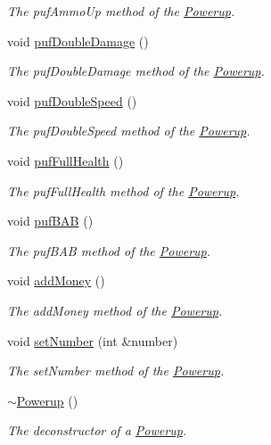 \begin{DoxyCompactItemize}
\begin{DoxyCompactList}\small\item\em The puf\+Ammo\+Up method of the \hyperlink{class_powerup}{Powerup}. \end{DoxyCompactList}\item 
void \hyperlink{class_powerup_a9e3e6d2edbd7ce8c873deedb22e1702f}{puf\+Double\+Damage} ()
\begin{DoxyCompactList}\small\item\em The puf\+Double\+Damage method of the \hyperlink{class_powerup}{Powerup}. \end{DoxyCompactList}\item 
void \hyperlink{class_powerup_ac009392b9c8baacde7677547fe599fb6}{puf\+Double\+Speed} ()
\begin{DoxyCompactList}\small\item\em The puf\+Double\+Speed method of the \hyperlink{class_powerup}{Powerup}. \end{DoxyCompactList}\item 
void \hyperlink{class_powerup_af40ff299d75a5602af3694f3e96858b0}{puf\+Full\+Health} ()
\begin{DoxyCompactList}\small\item\em The puf\+Full\+Health method of the \hyperlink{class_powerup}{Powerup}. \end{DoxyCompactList}\item 
void \hyperlink{class_powerup_a460b51e075104b753a01cc8f65f6d36e}{puf\+B\+A\+B} ()
\begin{DoxyCompactList}\small\item\em The puf\+B\+A\+B method of the \hyperlink{class_powerup}{Powerup}. \end{DoxyCompactList}\item 
void \hyperlink{class_powerup_ad94eaace43d88c536f3c7fcae4d3628a}{add\+Money} ()
\begin{DoxyCompactList}\small\item\em The add\+Money method of the \hyperlink{class_powerup}{Powerup}. \end{DoxyCompactList}\item 
void \hyperlink{class_powerup_a4210c58662eb9b035e5ec539fe9b76d2}{set\+Number} (int \&number)
\begin{DoxyCompactList}\small\item\em The set\+Number method of the \hyperlink{class_powerup}{Powerup}. \end{DoxyCompactList}\item 
\hyperlink{class_powerup_a2e1c97859d671527885e6f4eb200ca3f}{$\sim$\+Powerup} ()
\begin{DoxyCompactList}\small\item\em The deconstructor of a \hyperlink{class_powerup}{Powerup}. \end{DoxyCompactList}\end{DoxyCompactItemize}
